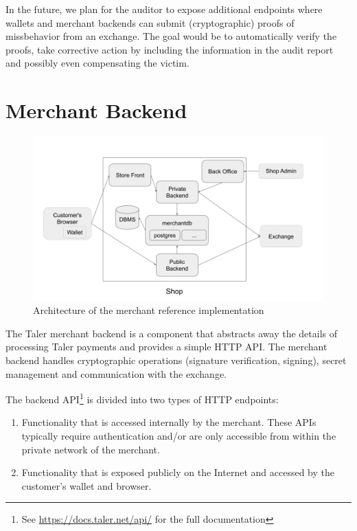 In the future, we plan for the auditor to expose additional endpoints where
wallets and merchant backends can submit (cryptographic) proofs of
missbehavior from an exchange. The goal would be to automatically verify the
proofs, take corrective action by including the information in the audit
report and possibly even compensating the victim.


\section{Merchant Backend}

\begin{figure}
    \includegraphics[width=\textwidth]{diagrams/taler-diagram-merchant.png}
    \caption{Architecture of the merchant reference implementation}
\end{figure}

The Taler merchant backend is a component that abstracts away the details of
processing Taler payments and provides a simple HTTP API.  The merchant backend
handles cryptographic operations (signature verification, signing), secret
management and communication with the exchange.

The backend API\footnote{See \url{https://docs.taler.net/api/} for the full documentation}
is divided into two types of HTTP endpoints:
\begin{enumerate}
  \item Functionality that is accessed internally by the merchant.  These APIs typically
    require authentication and/or are only accessible from within the private
    network of the merchant.
  \item Functionality that is exposed publicly on the Internet and accessed by the customer's wallet and browser.
\end{enumerate}

